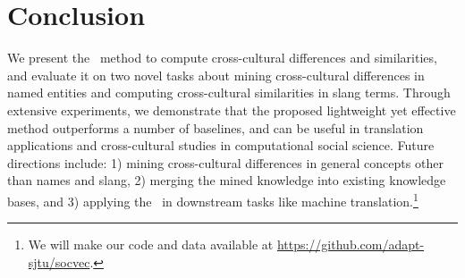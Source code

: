\section{Conclusion}
We present the \socvec\ method to compute cross-cultural differences and similarities, and evaluate it on two novel tasks about mining cross-cultural differences in named entities and computing cross-cultural similarities in slang terms.
Through extensive experiments, we demonstrate that the proposed lightweight yet effective method outperforms a number of baselines, and can be useful in 
translation applications and cross-cultural studies in 
computational social science. Future directions include: 1) mining cross-cultural differences in general concepts other than names and slang, 2) merging the mined knowledge into existing knowledge bases, and 3) applying the \socvec\ in downstream tasks like machine translation.\footnote{We will make our code and data available at \url{https://github.com/adapt-sjtu/socvec}.}

%
